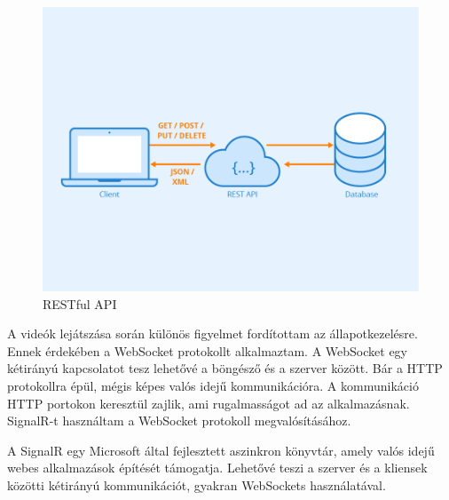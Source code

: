 \begin{figure}[H]
    \centering
    \includegraphics[width=9.0truecm]{images/Rest-API.png}
    \caption[RESTful API]{RESTful API \cite{restfulapi}}
    \label{fig:restfulapi}
\end{figure}

A videók lejátszása során különös figyelmet fordítottam
az állapotkezelésre. Ennek érdekében a WebSocket
protokollt alkalmaztam. A WebSocket egy kétirányú
kapcsolatot tesz lehetővé a böngésző és a szerver között.
Bár a HTTP protokollra épül, mégis képes valós idejű
kommunikációra. A kommunikáció HTTP portokon keresztül zajlik,
ami rugalmasságot ad az alkalmazásnak.
SignalR-t használtam a WebSocket protokoll megvalósításához.

A SignalR egy Microsoft által fejlesztett aszinkron könyvtár,
amely valós idejű webes alkalmazások építését támogatja.
Lehetővé teszi a szerver és a kliensek közötti kétirányú
kommunikációt, gyakran WebSockets használatával.

